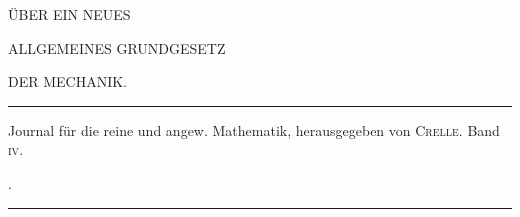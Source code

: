 \clearpage
\thispagestyle{empty}
\begin{center}
\vspace*{1.2in}
{\large ÜBER EIN NEUES\par}
\bigskip
{\Large ALLGEMEINES GRUNDGESETZ\par}
\bigskip
{\Large DER MECHANIK.\par}
\vfill
\rule{.8\textwidth}{.3pt}\par
\medskip
{\small Journal für die reine und angew. Mathematik, herausgegeben von \textsc{Crelle}. Band \textsc{iv}.\par}
.\par
\medskip
\rule{.8\textwidth}{.3pt}\par
\end{center}
\clearpage
